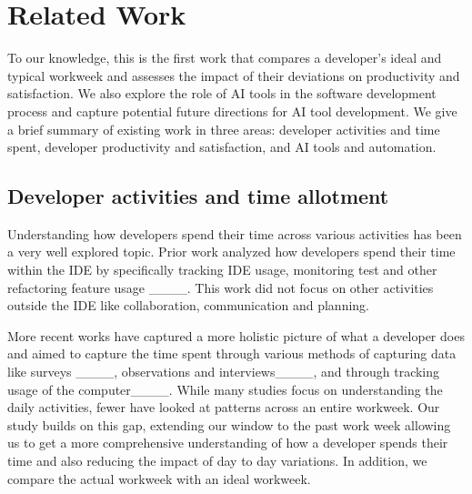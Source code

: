 \section{Related Work}
\label{sec:related_work}


To our knowledge, this is the first work that compares a developer's ideal and typical workweek and assesses the impact of their deviations on productivity and satisfaction. We also explore the role of AI tools in the software development process and capture potential future directions for AI tool development. We give a brief summary of existing work in three areas: developer activities and time spent, developer productivity and satisfaction, and AI tools and automation. 

\subsection{Developer activities and time allotment}
Understanding how developers spend their time across various activities has been a very well explored topic. Prior work analyzed how developers spend their time within the IDE by specifically tracking IDE usage, monitoring test and other refactoring feature usage ____. This work did not focus on other activities outside the IDE like collaboration, communication and planning.

More recent works have captured a more holistic picture of what a developer does and aimed to capture the time spent through various methods of capturing data like surveys ____, observations and interviews____, and through tracking usage of the computer____. While many studies focus on understanding the daily activities, fewer have looked at patterns across an entire workweek. Our study builds on this gap, extending our window to the past work week allowing us to get a more comprehensive understanding of how a developer spends their time and also reducing the impact of day to day variations. In addition, we compare the actual workweek with an ideal workweek.


